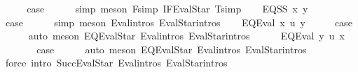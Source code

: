 \begin{isabellebody}
\ \ \isamarkupfalse%
\ \isamarkupfalse%
\ {\isacharquery}{\kern0pt}case\isanewline
\ \ \ \ \isamarkupfalse%
\ {\isacharparenleft}{\kern0pt}simp{\isacharsemicolon}{\kern0pt}\ meson\ F{\isacharunderscore}{\kern0pt}simp\ IF{\isacharunderscore}{\kern0pt}EvalStar\ T{\isacharunderscore}{\kern0pt}simp{\isacharparenright}{\kern0pt}\isanewline
{}\isamarkupfalse%
\isanewline
\ \ \isamarkupfalse%
\ {\isacharparenleft}{\kern0pt}EQ{\isacharunderscore}{\kern0pt}SS\ x\ y{\isacharparenright}{\kern0pt}\isanewline
\ \ \isamarkupfalse%
\ \isamarkupfalse%
\ {\isacharquery}{\kern0pt}case\isanewline
\ \ \ \ \isamarkupfalse%
\ {\isacharparenleft}{\kern0pt}simp{\isacharsemicolon}{\kern0pt}\ meson\ Eval{\isachardot}{\kern0pt}intros\ EvalStar{\isachardot}{\kern0pt}intros{\isacharparenright}{\kern0pt}\isanewline
{}\isamarkupfalse%
\isanewline
\ \ \isamarkupfalse%
\ {\isacharparenleft}{\kern0pt}EQ{\isacharunderscore}{\kern0pt}Eval{}\ x\ u\ y{\isacharparenright}{\kern0pt}\isanewline
\ \ \isamarkupfalse%
\ \isamarkupfalse%
\ {\isacharquery}{\kern0pt}case\isanewline
\ \ \ \ \isamarkupfalse%
\ {\isacharparenleft}{\kern0pt}auto{\isacharsemicolon}{\kern0pt}\ meson\ EQ{\isacharunderscore}{\kern0pt}EvalStar{}\ Eval{\isachardot}{\kern0pt}intros\ EvalStar{\isachardot}{\kern0pt}intros{\isacharparenright}{\kern0pt}{\isacharplus}{\kern0pt}\isanewline
{}\isamarkupfalse%
\isanewline
\ \ \ \ \isamarkupfalse%
\ {\isacharparenleft}{\kern0pt}EQ{\isacharunderscore}{\kern0pt}Eval{}\ y\ u\ x{\isacharparenright}{\kern0pt}\isanewline
\ \ \ \ \isamarkupfalse%
\ \isamarkupfalse%
\ {\isacharquery}{\kern0pt}case\isanewline
\ \ \ \ \isamarkupfalse%
\ {\isacharparenleft}{\kern0pt}auto{\isacharsemicolon}{\kern0pt}\ meson\ EQ{\isacharunderscore}{\kern0pt}EvalStar{}\ Eval{\isachardot}{\kern0pt}intros\ EvalStar{\isachardot}{\kern0pt}intros{\isacharparenright}{\kern0pt}{\isacharplus}{\kern0pt}\isanewline
{}\isamarkupfalse%
\ {\isacharparenleft}{\kern0pt}force\ intro{\isacharcolon}{\kern0pt}\ Succ{\isacharunderscore}{\kern0pt}EvalStar\ Eval{\isachardot}{\kern0pt}intros\ EvalStar{\isachardot}{\kern0pt}intros{\isacharparenright}{\kern0pt}{\isacharplus}{\kern0pt}%
\endisatagproof
{\isafoldproof}%
%
\isadelimproof
\isanewline
%
\endisadelimproof
%
\isadelimtheory
\isanewline
%
\endisadelimtheory
%
\isatagtheory
{}\isamarkupfalse%
%
\endisatagtheory
{\isafoldtheory}%
%
\isadelimtheory
%
\endisadelimtheory
%
\end{isabellebody}%

